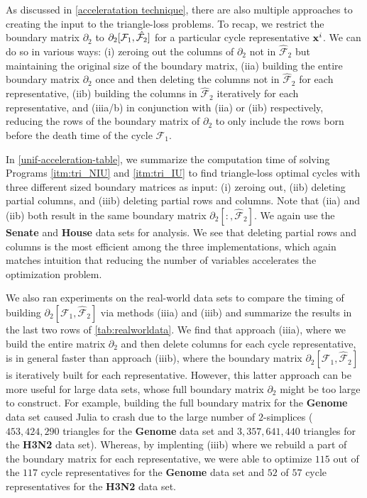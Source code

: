 As discussed in \se \ref{acceleratation technique}, there are also multiple approaches to creating the input to the triangle-loss problems. To recap, we restrict the boundary matrix $\partial_2$ to $\partial_{2}[\mathcal{F}_1, \hat {\mathcal{F}_2}]$ for a particular cycle representative $\mathbf{x}^i$. We can do so in various ways: (i) zeroing out the columns of $\partial_2$ not in $\hat{\mathcal{F}}_2$ but maintaining the original size of the boundary matrix, (iia) building the entire boundary matrix $\partial_2$ once and then deleting the columns not in $\hat{\mathcal{F}}_2$ for each representative, (iib) building the columns in $\hat{\mathcal{F}}_2$ iteratively for each representative, and (iiia/b) in conjunction with (iia) or (iib) respectively, reducing the rows of the boundary matrix of $\partial_2$ to only include the rows born before the death time of the cycle $\mathcal{F}_1$. 

In \tab \ref{unif-acceleration-table}, we summarize the computation time of solving Programs 
\ref{itm:tri_NIU} and
\ref{itm:tri_IU}
 to find triangle-loss optimal cycles with three different sized boundary matrices as input: (i) zeroing out, (iib) deleting partial columns, and (iiib) deleting partial rows and columns. Note that (iia) and (iib) both result in the same boundary matrix $\partial_2[:, \hat{\mathcal{F}}_2]$. We again use the \textbf{Senate} and \textbf{House} data sets for analysis. We see that deleting partial rows and columns is the most efficient among the three implementations, which again matches intuition that reducing the number of variables accelerates the optimization problem. 

We also ran experiments on the real-world data sets to compare the timing of building $\partial_{2}[ \mathcal{F}_1 , \hat {\mathcal{F}}_{2}]$ via methods (iiia) and (iiib) and summarize the results in the last two rows of \tab \ref{tab:realworldata}. We find that approach (iiia), where we build the entire matrix $\partial_2$ and then delete columns for each cycle representative, is in general faster than approach (iiib), where the boundary matrix $\partial_2[\mathcal{F}_1, \hat{\mathcal{F}}_2]$ is iteratively built for each representative. However, this latter approach can be more useful for large data sets, whose full boundary matrix $\partial_2$ might be too large to construct. For example, building the full boundary matrix for the \textbf{Genome} data set caused Julia to crash due to the large number  of $2$-simplices ($453{,}424{,}290$ triangles for the \textbf{Genome} data set and $3{,}357{,}641{,}440$ triangles for the \textbf{H3N2} data set). Whereas, by implenting (iiib) where we rebuild a part of the boundary matrix for each representative, we were able to optimize $115$ out of the $117$ cycle representatives for the \textbf{Genome} data set and $52$ of $57$ cycle representatives for the \textbf{H3N2} data set.

